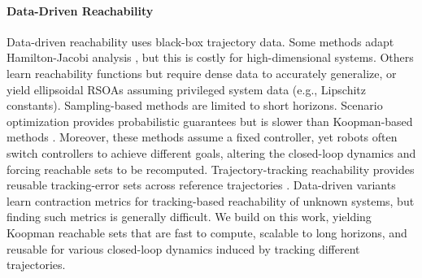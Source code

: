 \paragraph{Data-Driven Reachability}
Data-driven reachability uses black-box trajectory data. Some methods adapt Hamilton-Jacobi analysis \citep{reachblackboxdynamical}, but this is costly for high-dimensional systems. Others learn reachability functions \citep{neureach} but require dense data to accurately generalize, or yield ellipsoidal RSOAs \citep{10772635datadrivenreach} assuming privileged system data (e.g., Lipschitz constants). Sampling-based methods \citep{pmlr-v168-lew22a} are limited to short horizons. Scenario optimization provides probabilistic guarantees \citep{pmlr-v242-dietrich24a} but is slower than Koopman-based methods \citep{DBLP:journals/fmsd/BakBHKLP25}.
Moreover, these methods assume a fixed controller, yet robots often switch controllers to achieve different goals, altering the closed-loop dynamics and forcing reachable sets to be recomputed. Trajectory-tracking reachability provides reusable tracking-error sets across reference trajectories \citep{DBLP:conf/cdc/HerbertCHBFT17, DBLP:conf/wafr/SinghCHTP18, DBLP:journals/ral/KnuthCOB21}. Data-driven variants learn contraction metrics \citep{DBLP:conf/cdc/ChouOB21, DBLP:conf/wafr/ChouOB22, 10161001} for tracking-based reachability of unknown systems, but finding such metrics is generally difficult. We build on this work, yielding Koopman reachable sets that are fast to compute, scalable to long horizons, and reusable for various closed-loop dynamics induced by tracking different trajectories.